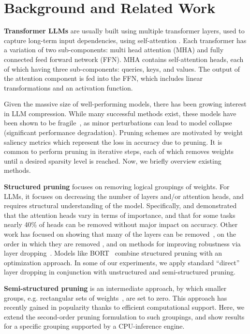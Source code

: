 \documentclass[11pt]{article}
\begin{document}
\section{Background and Related Work}

\noindent\textbf{Transformer LLMs} are usually built using multiple transformer layers, used to capture long-term input dependencies, using self-attention \cite{Vaswani2017AttentionIA}. Each transformer has a variation of two sub-components: multi head attention (MHA) and fully connected feed forward network (FFN). MHA contains self-attention heads, each of which having three sub-components: queries, keys, and values. The output of the attention component is fed into the FFN, which includes linear transformations and an activation function. 

Given the massive size of well-performing models, there has been growing interest in LLM compression. While many successful methods exist, these models have been shown to be  fragile~\cite{DBLP:journals/corr/abs-2105-06990}, as minor perturbations can lead to model collapse (significant performance degradation). Pruning schemes are motivated by weight saliency metrics which represent the loss in accuracy due to pruning. It is common to perform pruning in iterative steps, each of which removes weights until a desired sparsity level is reached. Now, we briefly overview existing methods.


\noindent\textbf{Structured pruning} focuses on removing logical groupings of weights. For LLMs, it focuses on decreasing the number of layers and/or attention heads, and requires structural understanding of the model. Specifically, \citet{Michel2019AreSH} and \citet{Voita2019AnalyzingMS} demonstrated that the attention heads vary in terms of importance, and that for some tasks nearly 40\% of heads can be removed without major impact on accuracy. Other work has focused on showing that many of the layers can be removed~\cite{Sridhar2020UndividedAA}, on the order in which they are removed \cite{DBLP:journals/corr/abs-2004-03844}, and on methods for improving robustness via layer dropping~\cite{fan2019reducing}. Models like BORT~\cite{DBLP:journals/corr/abs-2010-10499} combine structured pruning with an optimization approach. In some of our experiments, we apply standard ``direct'' layer dropping in conjunction with unstructured and semi-structured pruning.

\noindent\textbf{Semi-structured pruning} is an intermediate approach, by which smaller groups, e.g. rectangular sets of weights~\cite{lagunas21block}, are set to zero. This approach has recently gained in popularity thanks to efficient computational support. Here, we extend the second-order pruning formulation to such groupings, and show results for a specific grouping supported by a CPU-inference engine.
\end{document}
